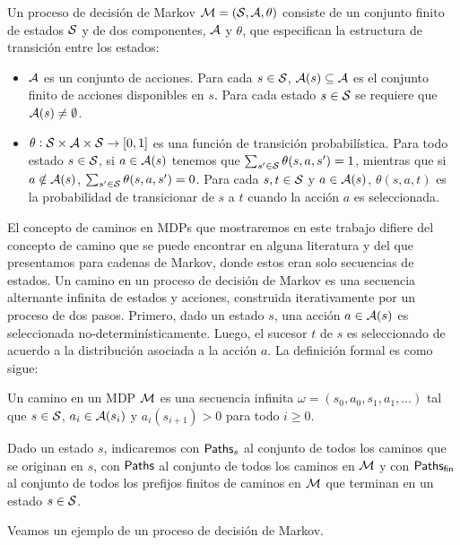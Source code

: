 \begin{definition}
	Un proceso de decisión de Markov $\mathcal{M} =(\mathcal{S}, \mathcal{A}, \theta)$ consiste de un conjunto finito de estados $\mathcal{S}$ y de dos componentes, $\mathcal{A}$ y $\theta$, que especifican la estructura de transición entre los estados:
	\begin{itemize}
		\item $\mathcal{A}$ es un conjunto de acciones. Para cada $s \in \mathcal{S}$, $\mathcal{A}(s) \subseteq \mathcal{A}$ es el conjunto finito de
		      acciones disponibles en $s$. Para cada estado $s \in \mathcal{S}$ se requiere que $\mathcal{A}(s) \neq \emptyset$.
		\item $\theta : \mathcal{S} \times \mathcal{A} \times \mathcal{S} \rightarrow [0,1]$ es una función de transición probabilística. Para todo estado $s \in \mathcal{S}$, si $a \in \mathcal{A}(s)$ tenemos que $\sum_{s' \in \mathcal{S}} \theta(s, a, s') = 1$, mientras que si $a \notin \mathcal{A}(s)$, $\sum_{s' \in \mathcal{S}} \theta(s, a, s') = 0$. Para cada $s, t \in \mathcal{S}$ y $a \in \mathcal{A}(s)$, $\theta(s, a, t)$ es la probabilidad de transicionar de $s$ a $t$ cuando la acción $a$ es seleccionada.
	\end{itemize}
\end{definition}

El concepto de caminos en MDPs que mostraremos en este trabajo difiere del
concepto de camino que se puede encontrar en alguna literatura y del que
presentamos para cadenas de Markov, donde estos eran solo secuencias de
estados. Un camino en un proceso de decisión de Markov es una secuencia
alternante infinita de estados y acciones, construida iterativamente por un
proceso de dos pasos. Primero, dado un estado $s$, una acción $a \in \mathcal{A}(s)$
es seleccionada no-determinísticamente. Luego, el sucesor $t$ de $s$ es
seleccionado de acuerdo a la distribución asociada a la acción $a$. La
definición formal es como sigue:

\begin{definition}
	Un camino en un MDP $\mathcal{M}$ es una secuencia infinita $\omega = (s_0, a_0, s_1, a_1, \dots)$ tal que $s \in \mathcal{S}$, $a_i \in \mathcal{A}(s_i)$ y $a_i(s_{i+1}) > 0$ para todo $i \geq 0$.

	Dado un estado $s$, indicaremos con $\textsf{Paths}_s$ al conjunto de todos los caminos
	que se originan en $s$, con $\textsf{Paths}$ al conjunto de todos los caminos en $\mathcal{M}$ y
	con $\textsf{Paths}_\textsf{fin}$ al conjunto de todos los prefijos finitos de caminos en $\mathcal{M}$
	que terminan en un estado $s \in \mathcal{S}$.
\end{definition}

Veamos un ejemplo de un proceso de decisión de Markov.

